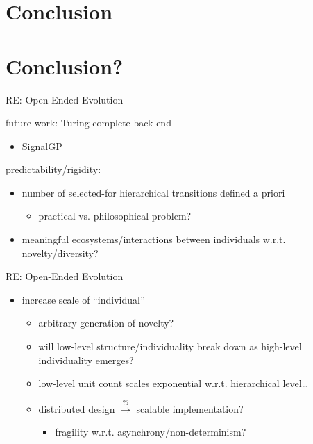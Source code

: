 \section{Conclusion}

\section{Conclusion?}

\begin{frame}{RE: Open-Ended Evolution}

future work: Turing complete back-end
\begin{itemize}
\item SignalGP \cite{lalejini2018evolving}
\end{itemize}

\pause
\vspace{2ex}

predictability/rigidity:
\begin{itemize}[<+->]
\item number of selected-for hierarchical transitions defined a priori
\begin{itemize}[<+->]
\item practical vs. philosophical problem?
\end{itemize}
\item meaningful ecosystems/interactions between individuals w.r.t. novelty/diversity? \cite{soros2014identifying,dolson2018evolution}
\end{itemize}

\end{frame}

\begin{frame}{RE: Open-Ended Evolution}

\begin{itemize}[<+->]
\item increase scale of ``individual''
  \begin{itemize}[<+->]
  \item arbitrary generation of novelty? \cite{banzhaf2015open}
  \item will low-level structure/individuality break down as high-level individuality emerges?
  \item low-level unit count scales exponential w.r.t. hierarchical level\dots
  \item distributed design $\stackrel{??}{\rightarrow}$ scalable implementation?
  \begin{itemize}
    \item fragility w.r.t. asynchrony/non-determinism? \cite{ackley2016indefinite}
  \end{itemize}
  \end{itemize}
\end{itemize}

\end{frame}

